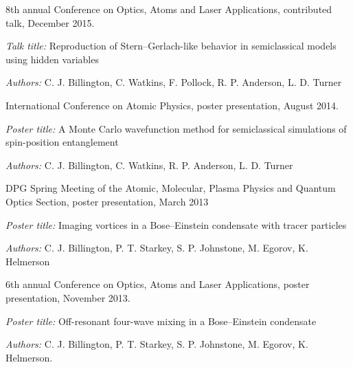 \documentclass[10pt,letterpaper]{article}
\renewenvironment{itemize}{
  \begin{list}{}{
    \setlength{\leftmargin}{1.5em}
    \setlength{\itemsep}{0.25em}
    \setlength{\parskip}{0pt}
    \setlength{\parsep}{0.25em}
  }
}{
  \end{list}
}
\begin{document}
\begin{itemize}


\item 8th annual Conference on Optics, Atoms and Laser Applications, contributed talk, December 2015.
   \begin{itemize}
      \item \textit{Talk title:}
      Reproduction of Stern--Gerlach-like behavior in semiclassical models using hidden variables
      \item\textit{Authors:}
      C. J. Billington, C. Watkins, F. Pollock, R. P. Anderson, L. D. Turner
    \end{itemize}

\item International Conference on Atomic Physics, poster presentation, August 2014.
   \begin{itemize}
      \item \textit{Poster title:}
      A Monte Carlo wavefunction method for semiclassical simulations of spin-position entanglement
      \item\textit{Authors:}
      C. J. Billington, C. Watkins, R. P. Anderson, L. D. Turner
    \end{itemize}

\item DPG Spring Meeting of the Atomic, Molecular, Plasma Physics and Quantum Optics Section, poster presentation, March 2013
  \begin{itemize}
      \item \textit{Poster title:}
      Imaging vortices in a Bose--Einstein condensate with tracer particles
      \item\textit{Authors:}
      C. J. Billington, P. T. Starkey, S. P. Johnstone, M. Egorov, K. Helmerson
    \end{itemize}

\item 6th annual Conference on Optics, Atoms and Laser Applications, poster presentation, November 2013.
   \begin{itemize}
      \item \textit{Poster title:}
      Off-resonant four-wave mixing in a Bose--Einstein condensate
      \item\textit{Authors:}
      C. J. Billington, P. T. Starkey, S. P. Johnstone, M. Egorov, K. Helmerson.
    \end{itemize}


\end{itemize}
\end{document}
